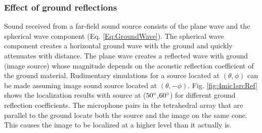 \subsubsection{Effect of ground reflections}
Sound received from a far-field sound source consists of the plane wave and the spherical wave component (Eq. \ref{Eq:GroundWave}). The spherical wave component creates a horizontal ground wave with the ground and quickly attenuates with distance. The plane wave creates a reflected wave with ground (image source) whose magnitude depends on the acoustic reflection coefficient of the ground material. Rudimentary simulations for a source located at $(\theta,\phi)$ can be made assuming image sound source located at $(\theta,-\phi)$. Fig. \ref{fig:4mic1srcRef} shows the localization results with source at ($50\degree$,$60\degree$) for different ground reflection coefficients. The microphone pairs in the tetrahedral array that are parallel to the ground locate both the source and the image on the same cone. This causes the image to be localized at a higher level than it actually is.
